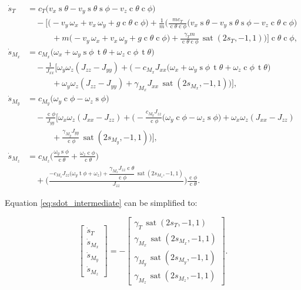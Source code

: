 \documentclass[conf]{new-aiaa}
\DeclareMathOperator{\s}{s}
\DeclareMathOperator{\cs}{c}
\DeclareMathOperator{\tn}{t}
\DeclareMathOperator{\sat}{sat}
\begin{document}
\small
\begingroup
\setlength{\jot}{1pt}
\begin{equation}
\label{eq:sdot_intermediate}
\begin{aligned}
\dot s_T
&= c_T\!\bigl(
v_x \s\theta - v_y \s\theta \s\phi - v_z \cs\theta \cs\phi
\bigr) \\
&\quad - \biggl[
\bigl(
-v_y \,\omega_x + v_x \,\omega_y + g \cs\theta \cs\phi
\bigr)
+ \frac{1}{m} \biggl(
\frac{m c_T}{\cs\theta \cs\phi} \bigl(
v_x \s\theta - v_y \s\theta \s\phi - v_z \cs\theta \cs\phi
\bigr) \\
&\qquad\quad
+ m \bigl(
-v_y \,\omega_x + v_x \,\omega_y + g \cs\theta \cs\phi
\bigr)
+ \frac{\gamma_T m}{\cs\theta \cs\phi}\,
\sat(2s_T,-1,1)
\biggr) \biggr] \cs\theta \cs\phi,
\\[0.35em]
\dot s_{M_x}
&= c_{M_x} \!\bigl(
\omega_x + \omega_y \s\phi \,\tn\theta + \omega_z \cs\phi \,\tn\theta
\bigr) \\
&\quad - \frac{1}{J_{xx}} \biggl[
\omega_y \omega_z (J_{zz} - J_{yy})
+ \bigl(
-c_{M_x} J_{xx} \bigl(
\omega_x + \omega_y \s\phi \,\tn\theta + \omega_z \cs\phi \,\tn\theta
\bigr) \\
&\qquad\quad
 + \omega_y \omega_z (J_{zz} - J_{yy})
 + \gamma_{M_x} J_{xx}\, \sat(2s_{M_x},-1,1)
\bigr) \biggr],
\\[0.35em]
\dot s_{M_y}
&= c_{M_y} \!\bigl(
\omega_y \cs\phi - \omega_z \s\phi
\bigr) \\
&\quad - \frac{\cs\phi}{J_{yy}} \biggl[
\omega_x \omega_z (J_{xx} - J_{zz})
+ \biggl(
-\frac{c_{M_y} J_{zz}}{\cs\phi} \bigl(
\omega_y \cs\phi - \omega_z \s\phi
\bigr)
 + \omega_x \omega_z (J_{xx} - J_{zz}) \\
&\qquad\quad
 + \frac{\gamma_{M_y} J_{yy}}{\cs\phi}\,
\sat(2s_{M_y},-1,1)
\biggr) \biggr],
\\[0.35em]
\dot s_{M_z}
&= c_{M_z} \!\biggl(
\frac{\omega_y \s\phi}{\cs\theta} + \frac{\omega_z \cs\phi}{\cs\theta}
\biggr) \\
&\quad + \biggl(
\frac{
-c_{M_z} J_{zz} \bigl( \omega_y \tn\phi + \omega_z \bigr)
 + \dfrac{\gamma_{M_z} J_{zz} \cs\theta}{\cs\phi}\,
\sat(2s_{M_z},-1,1)
}{J_{zz}}
\biggr) \frac{\cs\phi}{\cs\theta}.
\end{aligned}
\end{equation}
\endgroup
\normalsize

Equation \ref{eq:sdot_intermediate} can be simplified to:

\small
\begin{equation}
\label{eq:sdot_final}
\begin{bmatrix}
\dot s_T \\ \dot s_{M_x} \\ \dot s_{M_y} \\ \dot s_{M_z}
\end{bmatrix}
=
-\begin{bmatrix}
\gamma_T\, \sat(2s_T,-1,1) \\
\gamma_{M_x}\, \sat(2s_{M_x},-1,1) \\
\gamma_{M_y}\, \sat(2s_{M_y},-1,1) \\
\gamma_{M_z}\, \sat(2s_{M_z},-1,1)
\end{bmatrix}.
\end{equation}
\normalsize
\end{document}
